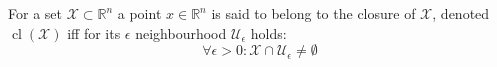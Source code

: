 For a set $\mathcal{X} \subset \mathbb{R}^n$ a point $x \in \mathbb{R}^n$ is said to belong to the closure of $\mathcal{X}$, denoted $\operatorname{cl}(\mathcal{X})$ iff for its $\epsilon$ neighbourhood $\mathcal{U}_{\epsilon}$ holds:
$$\forall \epsilon > 0 : \mathcal{X} \cap \mathcal{U}_{\epsilon} \neq \emptyset$$
